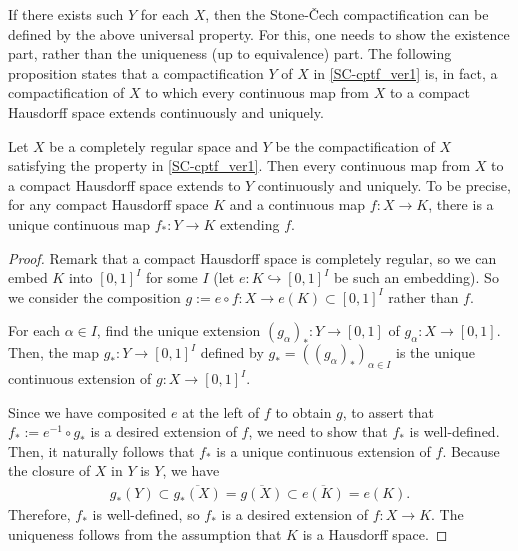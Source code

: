 If there exists such $Y$ for each $X$, then the Stone-\v{C}ech compactification can be defined by the above universal property.
For this, one needs to show the existence part, rather than the uniqueness (up to equivalence) part.
The following proposition states that a compactification $Y$ of $X$ in \cref{SC-cptf_ver1} is, in fact, a compactification of $X$ to which every continuous map from $X$ to a compact Hausdorff space extends continuously and uniquely.
\begin{prop}
    Let $X$ be a completely regular space and $Y$ be the compactification of $X$ satisfying the property in \cref{SC-cptf_ver1}.
    Then every continuous map from $X$ to a compact Hausdorff space extends to $Y$ continuously and uniquely.
    To be precise, for any compact Hausdorff space $K$ and a continuous map $f: X\rightarrow K$, there is a unique continuous map $f_*: Y\rightarrow K$ extending $f$.
\end{prop}
\begin{proof}
    Remark that a compact Hausdorff space is completely regular, so we can embed $K$ into $[0, 1]^I$ for some $I$ (let $e: K\hookrightarrow[0, 1]^I$ be such an embedding).
    So we consider the composition $g:=e\circ f: X\rightarrow e(K)\subset[0, 1]^I$ rather than $f$.
    
    For each $\alpha\in I$, find the unique extension $(g_\alpha)_*: Y\rightarrow[0, 1]$ of $g_\alpha: X\rightarrow[0, 1]$.
    Then, the map $g_*: Y\rightarrow[0, 1]^I$ defined by $g_*=((g_\alpha)_*)_{\alpha\in I}$ is the unique continuous extension of $g: X\rightarrow[0, 1]^I$.
    
    Since we have composited $e$ at the left of $f$ to obtain $g$, to assert that $f_*:=e^{-1}\circ g_*$ is a desired extension of $f$, we need to show that $f_*$ is well-defined.
    Then, it naturally follows that $f_*$ is a unique continuous extension of $f$.
    Because the closure of $X$ in $Y$ is $Y$, we have
    \begin{align*}
        g_*(Y)\subset\overline{g_*(X)}=\overline{g(X)}\subset\overline{e(K)}=e(K).
    \end{align*}
    Therefore, $f_*$ is well-defined, so $f_*$ is a desired extension of $f: X\rightarrow K$.
    The uniqueness follows from the assumption that $K$ is a Hausdorff space.
\end{proof}

